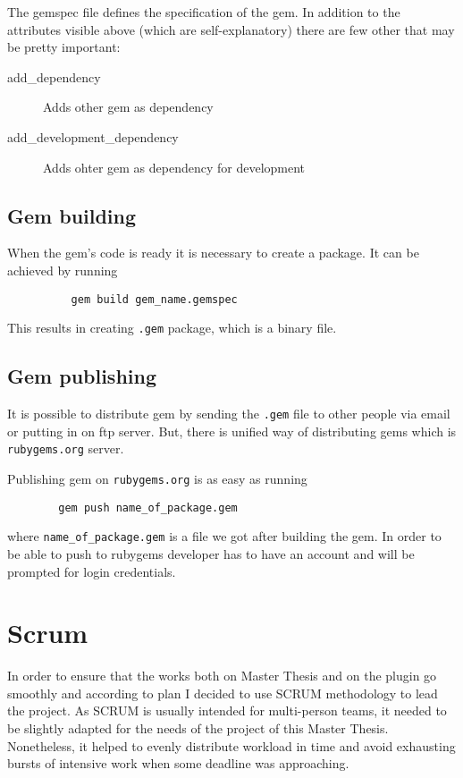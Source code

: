       

      The gemspec file defines the specification of the gem. In addition to the attributes visible
      above (which are self-explanatory) there are few other that may be pretty important:
      \begin{description}
        \item[add\_dependency] Adds other gem as dependency
        \item[add\_development\_dependency] Adds ohter gem as dependency for development
      \end{description}

    \subsection{Gem building}
      When the gem's code is ready it is necessary to create a package. It can be achieved by running

       \begin{lstlisting}
          gem build gem_name.gemspec
        \end{lstlisting}

      This results in creating \texttt{.gem} package, which is a binary file.

    \subsection{Gem publishing}
      It is possible to distribute gem by sending the \texttt{.gem} file to other people via email or
      putting in on ftp server. But, there is unified way of distributing gems which is
      \texttt{rubygems.org} server.

      Publishing gem on \texttt{rubygems.org} is as easy as running

      \begin{lstlisting}
        gem push name_of_package.gem
       \end{lstlisting}

      where \texttt{name\_of\_package.gem} is a file we got after building the gem. In order to be able to
      push to rubygems developer has to have an account and will be prompted for login credentials.
  \section{Scrum}
    In order to ensure that the works both on Master Thesis and on the plugin go smoothly and according to
    plan I decided to use SCRUM methodology to lead the project. As SCRUM is usually intended for
    multi-person teams, it needed to be slightly adapted for the needs of the project of this Master Thesis.
    Nonetheless, it helped to evenly distribute workload in time and avoid exhausting bursts of intensive work
    when some deadline was approaching.

